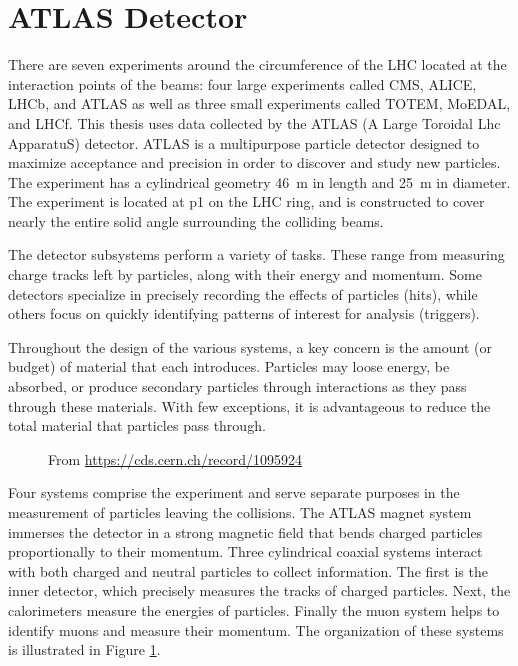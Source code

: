 \section{ATLAS Detector}
There are seven experiments around the circumference of the LHC located at the interaction points of the beams: four large experiments called CMS, ALICE, LHCb, and ATLAS as well as three small experiments called TOTEM, MoEDAL, and LHCf.
This thesis uses data collected by the ATLAS (A Large Toroidal Lhc ApparatuS) detector.
ATLAS is a multipurpose particle detector designed to maximize acceptance and precision in order to discover and study new particles.
The experiment has a cylindrical geometry 46~m in length and 25~m in diameter.
The experiment is located at p1 on the LHC ring, and is constructed to cover nearly the entire solid angle surrounding the colliding beams. \cite{atlasFacts}

The detector subsystems perform a variety of tasks.
These range from measuring charge tracks left by particles, along with their energy and momentum.
Some detectors specialize in precisely recording the effects of particles (hits), while others focus on quickly identifying patterns of interest for analysis (triggers).

Throughout the design of the various systems, a key concern is the amount (or budget) of material that each introduces.
Particles may loose energy, be absorbed, or produce secondary particles through interactions as they pass through these materials.
With few exceptions, it is advantageous to reduce the total material that particles pass through.

\begin{figure}[h!]
\captionsetup[subfigure]{position=b}
\centering
{}
\caption{From \url{https://cds.cern.ch/record/1095924}}
\label{fig:atlasLayout}
\end{figure}

Four systems comprise the experiment and serve separate purposes in the measurement of particles leaving the collisions.
The ATLAS magnet system immerses the detector in a strong magnetic field that bends charged particles proportionally to their momentum.
Three cylindrical coaxial systems interact with both charged and neutral particles to collect information.
The first is the inner detector, which precisely measures the tracks of charged particles.
Next, the calorimeters measure the energies of particles.
Finally the muon system helps to identify muons and measure their momentum.
The organization of these systems is illustrated in Figure \ref{fig:atlasLayout}.

